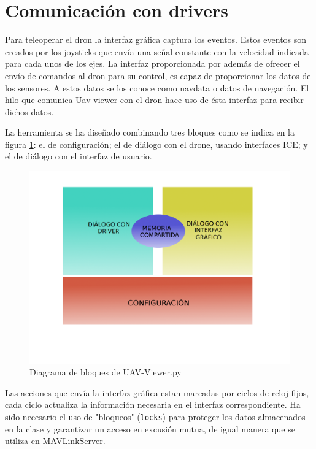 \section{Comunicación con drivers} 

Para teleoperar el dron la interfaz gráfica captura los eventos. Estos eventos son creados por los joysticks que envía una señal constante con la velocidad indicada para cada unos de los ejes. La interfaz proporcionada por además de ofrecer el envío de comandos al dron para su control, es capaz de proporcionar los datos de los sensores. A estos datos se los conoce como navdata o datos de navegación. El hilo que comunica Uav viewer con el dron hace uso de ésta interfaz para recibir dichos datos. 

La herramienta se ha diseñado combinando tres bloques como se indica en la figura \ref{fig:memoriaUav}: el de configuración; el de diálogo con el drone, usando interfaces ICE; y el de diálogo con el interfaz de usuario.

\begin{figure}[H]
  \centering
  \includegraphics[scale=0.3]{imagenes/MemoriaCompartidaUAV.png}
  \caption{Diagrama de bloques de UAV-Viewer.py}
  \label{fig:memoriaUav}
\end{figure}

Las acciones que envía la interfaz gráfica estan marcadas por ciclos de reloj fijos, cada ciclo actualiza la información necesaria en el interfaz correspondiente. Ha sido necesario el uso de "bloqueos" (\texttt{locks}) para proteger los datos almacenados en la clase y garantizar un acceso en excusión mutua, de igual manera que se utiliza en MAVLinkServer.

